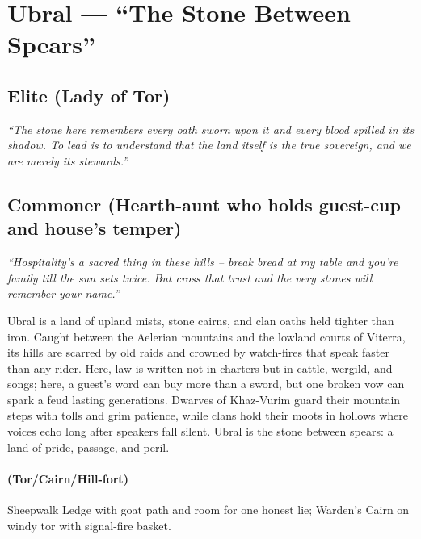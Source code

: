 \section{Ubral --- ``The Stone Between Spears''}
\label{chap:ubral}

\subsection*{Elite (Lady of Tor)}
\textit{``The stone here remembers every oath sworn upon it and every blood spilled in its shadow. To lead is to understand that the land itself is the true sovereign, and we are merely its stewards.''}

\subsection*{Commoner (Hearth-aunt who holds guest-cup and house's temper)}
\textit{``Hospitality's a sacred thing in these hills – break bread at my table and you're family till the sun sets twice. But cross that trust and the very stones will remember your name.''}

\begin{tcolorbox}[colback=black!3,colframe=black!40!white,title={Theme \& Atmosphere}]
Ubral is a land of upland mists, stone cairns, and clan oaths held tighter than iron. Caught between the Aelerian mountains and the lowland courts of Viterra, its hills are scarred by old raids and crowned by watch-fires that speak faster than any rider. Here, law is written not in charters but in cattle, wergild, and songs; here, a guest's word can buy more than a sword, but one broken vow can spark a feud lasting generations. Dwarves of Khaz-Vurim guard their mountain steps with tolls and grim patience, while clans hold their moots in hollows where voices echo long after speakers fall silent. Ubral is the stone between spears: a land of pride, passage, and peril.
\end{tcolorbox}

\paragraph*{(Tor/Cairn/Hill-fort)} Sheepwalk Ledge with goat path and room for one honest lie; Warden's Cairn on windy tor with signal-fire basket.

